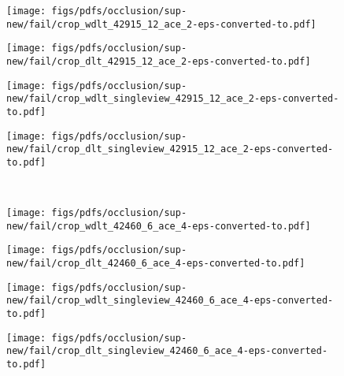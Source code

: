 \documentclass[runningheads]{llncs}
\begin{document}
\begin{figure*}
	\begin{subfigure}[b]{0.24\linewidth}        \centering
		\texttt{[image: figs/pdfs/occlusion/sup-new/fail/crop\_wdlt\_42915\_12\_ace\_2-eps-converted-to.pdf]}
	\end{subfigure}
	\begin{subfigure}[b]{0.24\linewidth}        \centering
		\texttt{[image: figs/pdfs/occlusion/sup-new/fail/crop\_dlt\_42915\_12\_ace\_2-eps-converted-to.pdf]}
	\end{subfigure}
	\begin{subfigure}[b]{0.24\linewidth}        \centering
		\texttt{[image: figs/pdfs/occlusion/sup-new/fail/crop\_wdlt\_singleview\_42915\_12\_ace\_2-eps-converted-to.pdf]}
	\end{subfigure}
	\begin{subfigure}[b]{0.24\linewidth}        \centering
		\texttt{[image: figs/pdfs/occlusion/sup-new/fail/crop\_dlt\_singleview\_42915\_12\_ace\_2-eps-converted-to.pdf]}
	\end{subfigure} \\   \vspace{1mm}
	
	\begin{subfigure}[b]{0.24\linewidth}        \centering
		\texttt{[image: figs/pdfs/occlusion/sup-new/fail/crop\_wdlt\_42460\_6\_ace\_4-eps-converted-to.pdf]}
\end{subfigure}
	\begin{subfigure}[b]{0.24\linewidth}        \centering
		\texttt{[image: figs/pdfs/occlusion/sup-new/fail/crop\_dlt\_42460\_6\_ace\_4-eps-converted-to.pdf]}
\end{subfigure}
	\begin{subfigure}[b]{0.24\linewidth}        \centering
		\texttt{[image: figs/pdfs/occlusion/sup-new/fail/crop\_wdlt\_singleview\_42460\_6\_ace\_4-eps-converted-to.pdf]}
\end{subfigure}
	\begin{subfigure}[b]{0.24\linewidth}        \centering
		\texttt{[image: figs/pdfs/occlusion/sup-new/fail/crop\_dlt\_singleview\_42460\_6\_ace\_4-eps-converted-to.pdf]}
\end{subfigure}  \\ 
	

\end{figure*}
\end{document}
